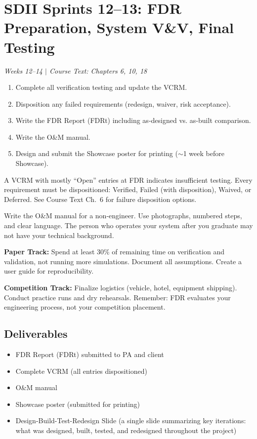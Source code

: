 \section{SDII Sprints 12--13: FDR Preparation, System V\&V, Final Testing}
\textit{Weeks 12--14 $|$ Course Text: Chapters 6, 10, 18}

\begin{priorities}
\begin{enumerate}[nosep]
\item Complete all verification testing and update the VCRM.
\item Disposition any failed requirements (redesign, waiver, risk acceptance).
\item Write the FDR Report (FDRt) including as-designed vs. as-built comparison.
\item Write the O\&M manual.
\item Design and submit the Showcase poster for printing ($\sim$1 week before Showcase).
\end{enumerate}
\end{priorities}

\begin{warnbox}
A VCRM with mostly ``Open'' entries at FDR indicates insufficient testing. Every requirement must be dispositioned: Verified, Failed (with disposition), Waived, or Deferred. See Course Text Ch.~6 for failure disposition options.
\end{warnbox}

\begin{protip}
Write the O\&M manual for a non-engineer. Use photographs, numbered steps, and clear language. The person who operates your system after you graduate may not have your technical background.
\end{protip}

\begin{faqbox}
\textbf{Paper Track:} Spend at least 30\% of remaining time on verification and validation, not running more simulations. Document all assumptions. Create a user guide for reproducibility.

\textbf{Competition Track:} Finalize logistics (vehicle, hotel, equipment shipping). Conduct practice runs and dry rehearsals. Remember: FDR evaluates your engineering process, not your competition placement.
\end{faqbox}

\subsection{Deliverables}
\begin{itemize}[nosep,leftmargin=1.5em]
\item FDR Report (FDRt) submitted to PA and client
\item Complete VCRM (all entries dispositioned)
\item O\&M manual
\item Showcase poster (submitted for printing)
\item Design-Build-Test-Redesign Slide (a single slide summarizing key iterations: what was designed, built, tested, and redesigned throughout the project)
\end{itemize}


